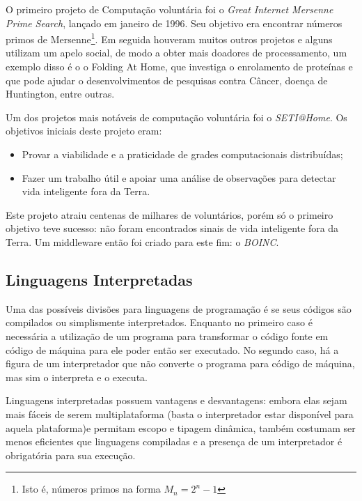 \documentclass[a4paper,12pt,titlepage]{article}
\begin{document}
O primeiro projeto de Computação voluntária foi o \textit{Great Internet Mersenne Prime Search}, lançado em janeiro de 1996. 
Seu objetivo era encontrar números primos de Mersenne\footnote{Isto é, números primos na forma $M_n = 2^n - 1$}. Em seguida houveram 
muitos outros projetos e alguns utilizam um apelo social, de modo a obter mais doadores de processamento, um exemplo disso é o
o Folding At Home, que investiga o enrolamento de proteínas e que pode ajudar o desenvolvimentos de pesquisas contra 
Câncer, doença de Huntington, entre outras. 

Um dos projetos mais notáveis de computação voluntária foi o \textit{SETI@Home}. Os objetivos iniciais deste projeto eram: 

\begin{itemize}
  \item Provar a viabilidade e a praticidade de grades computacionais distribuídas;
  \item Fazer um trabalho útil e apoiar uma análise de observações para detectar vida inteligente fora da Terra.
\end{itemize}

Este projeto atraiu centenas de milhares de voluntários, porém só o primeiro objetivo teve sucesso: não foram encontrados sinais 
de vida inteligente fora da Terra. Um middleware então foi criado para este fim: o \textit{BOINC}. 

\subsection{Linguagens Interpretadas}


Uma das possíveis divisões para linguagens de programação é se seus códigos são compilados ou simplismente interpretados. Enquanto no primeiro caso
é necessária a utilização de um programa para transformar o código fonte em código de máquina para ele poder então ser executado. No segundo caso,
há a figura de um interpretador que não converte o programa para código de máquina, mas sim o interpreta e o executa. 

Linguagens interpretadas possuem vantagens e desvantagens: embora elas sejam mais fáceis de serem multiplataforma (basta o interpretador
estar disponível para aquela plataforma)e permitam escopo e tipagem dinâmica, também costumam ser menos eficientes que linguagens compiladas e 
a presença de um interpretador é obrigatória para sua execução. 
\end{document}
